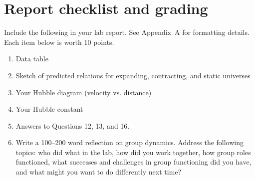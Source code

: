 \section{Report checklist and grading}

Include the following in your lab report. See Appendix~A for formatting details. Each item below is worth 10 points.

\begin{enumerate}
	\item Data table
	
	\item Sketch of predicted relations for expanding, contracting, and static universes
	
	\item Your Hubble diagram (velocity vs. distance)
	
	\item Your Hubble constant
	
	\item Answers to Questions 12, 13, and 16.
	
	\item Write a 100--200 word reflection on group dynamics. Address the following topics: who did what in the lab, how did you work together, how group roles functioned, what successes and challenges in group functioning did you have, and what might you want to do differently next time?
\end{enumerate}
